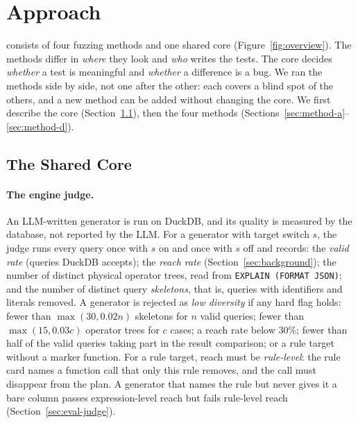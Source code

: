 \section{Approach}
\label{sec:approach}



\tool consists of four fuzzing methods and one shared core (Figure~\ref{fig:overview}). The methods differ in
\emph{where} they look and \emph{who} writes the tests. The core decides \emph{whether} a test is meaningful and
\emph{whether} a difference is a bug. We ran the methods side by side, not one after the other: each covers a blind
spot of the others, and a new method can be added without changing the core. We first describe the core
(Section~\ref{sec:core}), then the four methods (Sections~\ref{sec:method-a}--\ref{sec:method-d}).

\subsection{The Shared Core}
\label{sec:core}

\paragraph{ The engine judge.}
\label{sec:judge}
An LLM-written generator is run on DuckDB, and its quality is measured by the database, not reported by the LLM. For a
generator with target switch $s$, the judge runs every query once with $s$ on and once with $s$ off and records:
the \emph{valid rate} (queries DuckDB accepts); the \emph{reach rate} (Section~\ref{sec:background}); the number of
distinct physical operator trees, read from \texttt{EXPLAIN (FORMAT JSON)}; and the number of distinct query
\emph{skeletons}, that is, queries with identifiers and literals removed. A generator is rejected as \emph{low
diversity} if any hard flag holds: fewer than $\max(30, 0.02 n)$ skeletons for $n$ valid queries; fewer than
$\max(15, 0.03 c)$ operator trees for $c$ cases; a reach rate below 30\%; fewer than half of the valid queries taking
part in the result comparison; or a rule target without a marker function. For a rule target, reach must be
\emph{rule-level}: the rule card names a function call that only this rule removes, and the call must disappear from
the plan. A generator that names the rule but never gives it a bare column passes expression-level reach but fails
rule-level reach (Section~\ref{sec:eval-judge}).

